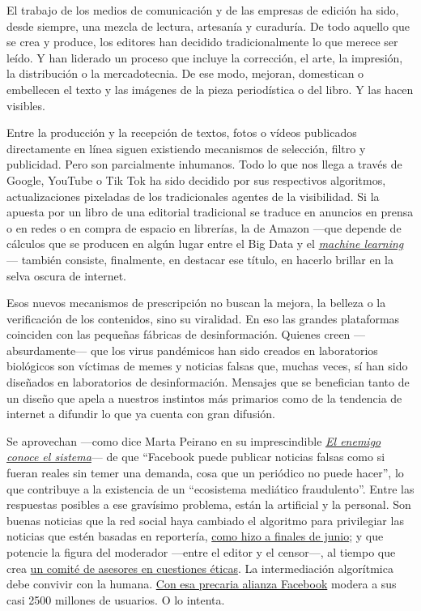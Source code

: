 El trabajo de los medios de comunicación y de las empresas de edición ha
sido, desde siempre, una mezcla de lectura, artesanía y curaduría. De
todo aquello que se crea y produce, los editores han decidido
tradicionalmente lo que merece ser leído. Y han liderado un proceso que
incluye la corrección, el arte, la impresión, la distribución o la
mercadotecnia. De ese modo, mejoran, domestican o embellecen el texto y
las imágenes de la pieza periodística o del libro. Y las hacen visibles.

Entre la producción y la recepción de textos, fotos o vídeos publicados
directamente en línea siguen existiendo mecanismos de selección, filtro
y publicidad. Pero son parcialmente inhumanos. Todo lo que nos llega a
través de Google, YouTube o Tik Tok ha sido decidido por sus respectivos
algoritmos, actualizaciones pixeladas de los tradicionales agentes de la
visibilidad. Si la apuesta por un libro de una editorial tradicional se
traduce en anuncios en prensa o en redes o en compra de espacio en
librerías, la de Amazon ---que depende de cálculos que se producen en
algún lugar entre el Big Data y el
\href{https://www.bbva.com/es/machine-learning-que-es-y-como-funciona/}{\emph{machine
learning}}--- también consiste, finalmente, en destacar ese título, en
hacerlo brillar en la selva oscura de internet.

Esos nuevos mecanismos de prescripción no buscan la mejora, la belleza o
la verificación de los contenidos, sino su viralidad. En eso las grandes
plataformas coinciden con las pequeñas fábricas de desinformación.
Quienes creen ---absurdamente--- que los virus pandémicos han sido
creados en laboratorios biológicos son víctimas de memes y noticias
falsas que, muchas veces, sí han sido diseñados en laboratorios de
desinformación. Mensajes que se benefician tanto de un diseño que apela
a nuestros instintos más primarios como de la tendencia de internet a
difundir lo que ya cuenta con gran difusión.

Se aprovechan ---como dice Marta Peirano en su imprescindible
\href{https://www.megustaleer.com/libros/el-enemigo-conoce-el-sistema/MES-106841}{\emph{El
enemigo conoce el sistema}}--- de que ``Facebook puede publicar noticias
falsas como si fueran reales sin temer una demanda, cosa que un
periódico no puede hacer'', lo que contribuye a la existencia de un
``ecosistema mediático fraudulento''. Entre las respuestas posibles a
ese gravísimo problema, están la artificial y la personal. Son buenas
noticias que la red social haya cambiado el algoritmo para privilegiar
las noticias que estén basadas en reportería,
\href{https://fundaciongabo.org/es/etica-periodistica/noticias/facebook-cambia-su-algoritmo-para-favorecer-al-periodismo-con-reporteria}{como
hizo a finales de junio}; y que potencie la figura del moderador
---entre el editor y el censor---, al tiempo que crea
\href{https://www.nytimes.com/es/2020/05/06/espanol/opinion/facebook-junta-supervision.html}{un
comité de asesores en cuestiones éticas}. La intermediación algorítmica
debe convivir con la humana.
\href{https://www.nytimes.com/es/2018/12/28/espanol/facebook-moderadores.html}{Con
esa precaria alianza Facebook} modera a sus casi 2500 millones de
usuarios. O lo intenta.

